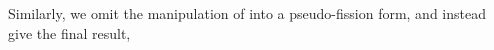 Similarly, we omit the manipulation of  into a pseudo-fission form, and instead give the final result,
%
